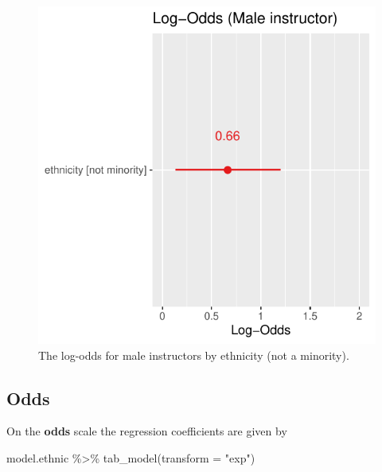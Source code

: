 \documentclass[
  letterpaper,
  DIV=11,
  numbers=noendperiod]{scrartcl}
\newenvironment{Shaded}{\begin{snugshade}}{\end{snugshade}}
\newcommand{\AttributeTok}[1]{\textcolor[rgb]{0.40,0.45,0.13}{#1}}
\newcommand{\FunctionTok}[1]{\textcolor[rgb]{0.28,0.35,0.67}{#1}}
\newcommand{\NormalTok}[1]{\textcolor[rgb]{0.00,0.23,0.31}{#1}}
\newcommand{\SpecialCharTok}[1]{\textcolor[rgb]{0.37,0.37,0.37}{#1}}
\newcommand{\StringTok}[1]{\textcolor[rgb]{0.13,0.47,0.30}{#1}}
\begin{document}
\begin{figure}[H]

{\centering \includegraphics{index_files/figure-pdf/unnamed-chunk-47-1.pdf}

}

\caption{The log-odds for male instructors by ethnicity (not a
minority).}

\end{figure}%

\subsection{Odds}\label{odds-1}

On the \textbf{odds} scale the regression coefficients are given by

\begin{Shaded}
\begin{Highlighting}[]
\NormalTok{model.ethnic }\SpecialCharTok{\%\textgreater{}\%}
  \FunctionTok{tab\_model}\NormalTok{(}\AttributeTok{transform =} \StringTok{"exp"}\NormalTok{)}
\end{Highlighting}
\end{Shaded}
\end{document}
